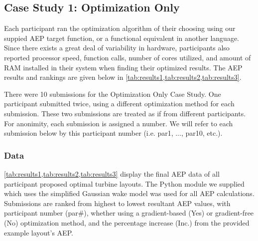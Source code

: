 
\subsection{Case Study 1: Optimization Only}\label{sec:res-optonly}

	Each participant ran the optimization algorithm of their choosing using our suppied AEP target function, or a functional equivalent in another language.
	Since there exists a great deal of variability in hardware, participants also reported processor speed, function calls, number of cores utilized, and amount of RAM installed in their system when finding their optimized results.
	The AEP results and rankings are given below in \cref{tab:results1,tab:results2,tab:results3}.

	There were 10 submissions for the Optimization Only Case Study.
	One participant submitted twice, using a different optimization method for each submission.
	These two submissions are treated as if from different participants.
	For anonimity, each submission is assigned a number.
	We will refer to each submission below by this participant number (i.e. par1, ..., par10, etc.).

	\subsubsection{Data}

	\cref{tab:results1,tab:results2,tab:results3} display the final AEP data of all participant proposed optimal turbine layouts.
	The Python module we supplied which uses the simplified Gaussian wake model was used for all AEP calculations.
	Submissions are ranked from highest to lowest resultant AEP values, with participant number (par\#), whether using a gradient-based (Yes) or gradient-free (No) optimization method, and the percentage increase (Inc.) from the provided example layout's AEP.

